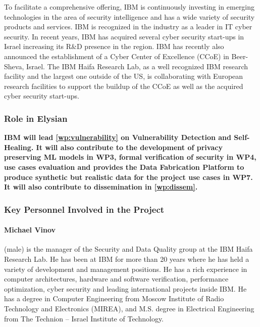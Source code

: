 \documentclass[a4paper,11pt]{article}
\begin{document}
To facilitate a comprehensive offering, IBM is continuously investing in emerging technologies in the area of security intelligence and has a wide variety of security products and services. IBM is recognized in the industry as a leader in IT cyber security.
In recent years, IBM has acquired several cyber security start-ups in Israel increasing its R\&D presence in the region. IBM has recently also announced the establishment of a Cyber Center of Excellence (CCoE) in Beer-Sheva, Israel. The IBM Haifa Research Lab, as a well recognized IBM research facility and the largest one outside of the US, is collaborating with European research facilities to support the buildup of the CCoE as well as the acquired cyber security start-ups.

\vspace{10pt}
\subsubsection*{Role in Elysian}
\textbf{IBM will lead  \ref{wp:vulnerability}  on Vulnerability Detection and Self-Healing. It will also contribute to the development of privacy preserving ML models in WP3, formal verification of security in WP4, use cases evaluation and provides the Data Fabrication Platform to produce synthetic but realistic data for the project use cases in WP7. It will also contribute to dissemination in
\ref{wp:dissem}.}

\vspace{10pt}
\subsubsection*{Key Personnel Involved in the Project}

\paragraph{Michael Vinov} (male) is the manager of the Security and Data Quality group at the IBM Haifa Research Lab. He has been at IBM for more than 20 years where he has held a variety of development and management positions. He has a rich experience in computer architectures, hardware and software verification, performance optimization, cyber security and leading international projects inside IBM. He has a degree in Computer Engineering from Moscow Institute of Radio Technology and Electronics (MIREA), and M.S. degree in Electrical Engineering from The Technion -- Israel Institute of Technology.
\end{document}
